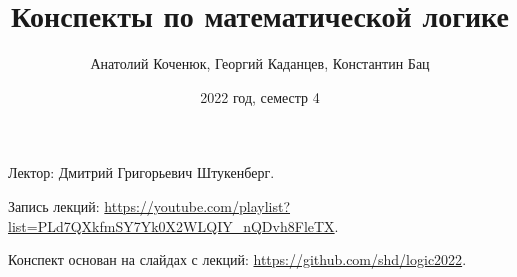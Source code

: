 \documentclass[10pt]{article}
\title{Конспекты по математической логике}
\author{Анатолий Коченюк, Георгий Каданцев, Константин Бац}
\date{2022 год, семестр 4}
\begin{document}
\maketitle

Лектор: Дмитрий Григорьевич Штукенберг.

Запись лекций: \url{https://youtube.com/playlist?list=PLd7QXkfmSY7Yk0X2WLQIY_nQDvh8FleTX}.

Конспект основан на слайдах с лекций: \url{https://github.com/shd/logic2022}.















\end{document}
